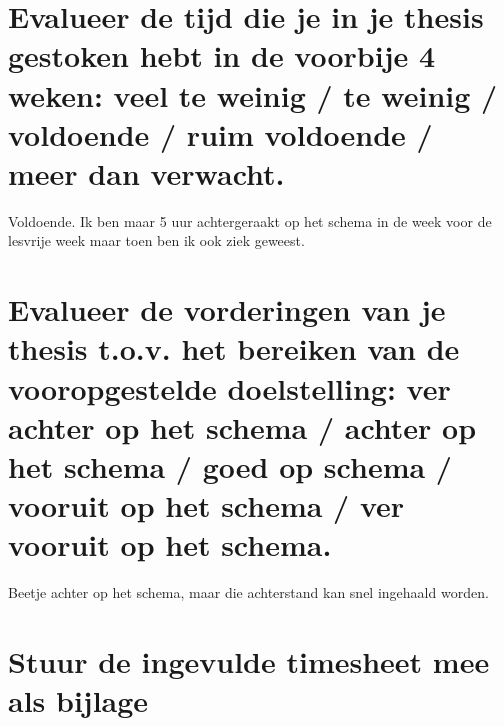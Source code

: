 \documentclass[a4paper, 11pt]{article}
\begin{document}
\section{Evalueer de tijd die je in je thesis gestoken hebt in de voorbije 4 weken: veel te weinig / te weinig / voldoende / ruim voldoende / meer dan verwacht.}
Voldoende. Ik ben maar 5 uur achtergeraakt op het schema in de week voor de lesvrije week maar toen ben ik ook ziek geweest. 

\section{Evalueer de vorderingen van je thesis t.o.v. het bereiken van de vooropgestelde doelstelling: ver achter op het schema / achter op het schema / goed op schema / vooruit op het schema / ver vooruit op het schema.}
Beetje achter op het schema, maar die achterstand kan snel ingehaald worden.
\section{Stuur de ingevulde timesheet mee als bijlage}
\end{document}
